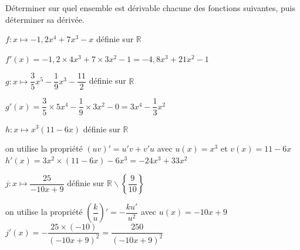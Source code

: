 \documentclass[11pt,a4paper]{article}  %
\begin{document}
Déterminer sur quel ensemble est dérivable chacune des fonctions suivantes, puis déterminer sa dérivée.
	\begin{enumMet}
		\item $f: x \mapsto-1,2 x^4+7 x^3-x$ définie sur $\mathbb{R}$
		\begin{corrBox}
			$f'(x)=-1,2\times4x^3+7\times3x^2-1=-4,8x^3+21x^2-1$
		\end{corrBox}
		\item $g: x \mapsto \dfrac{3}{5} x^5-\dfrac{1}{9} x^3-\dfrac{11}{2}$ définie sur $\mathbb{R}$
		\begin{corrBox}
			$g'(x)=\dfrac{3}{5}\times5x^4-\dfrac{1}{9}\times3x^2-0=3x^4-\dfrac{1}{3}x^2$
		\end{corrBox}
		\item $h: x \mapsto x^3(11-6 x)$ définie sur $\mathbb{R}$
		\begin{corrBox}
			on utilise la propriété $(uv)'=u'v+v'u$ avec $u(x)=x^3$ et $v(x)=11-6 x$\\
			$h'(x)=3x^2\times(11-6x)-6x^3=-24x^3+33x^2$
		\end{corrBox}
		\item $j: x \mapsto \dfrac{25}{-10 x+9}$ définie sur $\mathbb{R} \backslash\left\{\dfrac{9}{10}\right\}$
		\begin{corrBox}
			on utilise la propriété $\left(\dfrac{k}{u}\right)'=-\dfrac{ku'}{u^2}$ avec $u(x)=-10x+9$\\
			$j'(x)=-\dfrac{25\times (-10)}{(-10x+9)^2}=\dfrac{250}{(-10x+9)^2}$
		\end{corrBox}
	\end{enumMet}

\exercice{}
\end{document}
